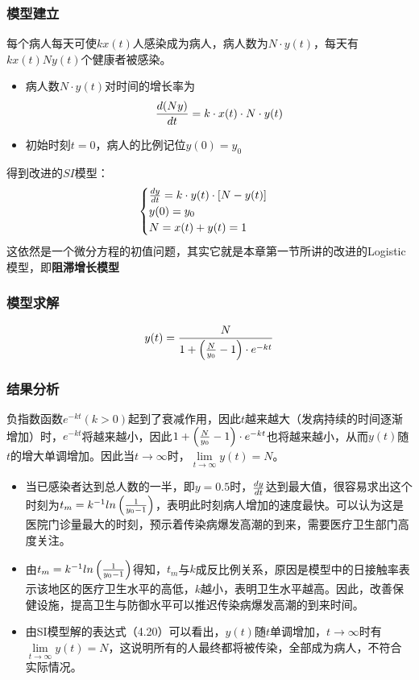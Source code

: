 \documentclass[openany]{progbookcn}
\begin{document}
\subsubsection{模型建立}
\indent 每个病人每天可使$kx(t)$人感染成为病人，病人数为$N\cdot y(t)$，每天有$kx(t)Ny(t)$个健康者被感染。
\begin{itemize}
\item 病人数$N\cdot y(t)$对时间的增长率为
\begin{equation}
{{d(Ny)}\over{dt}}=k\cdot x(t)\cdot N\cdot y(t)
\end{equation}
\item 初始时刻$t=0$，病人的比例记位$y(0)=y_0$
\end{itemize}
\indent 得到改进的$SI$模型：
\begin{equation}
\begin{cases}
{{dy}\over{dt}}=k\cdot y(t)\cdot{[N-y(t)]}\\
y(0)=y_0\\
N=x(t)+y(t)=1
\end{cases}
\end{equation}
\indent 这依然是一个微分方程的初值问题，其实它就是本章第一节所讲的改进的Logistic模型，即{\bf 阻滞增长模型}
\subsubsection{模型求解}
\begin{equation}
y(t)={{N}\over{1+{\left({N\over y_0}-1\right)\cdot e^{-kt}}}}
\end{equation}
\subsubsection{结果分析}
\indent 负指数函数$e^{-kt}(k>0)$起到了衰减作用，因此$t$越来越大（发病持续的时间逐渐增加）时，$e^{-kt}$将越来越小，因此$1+{\left({N\over y_0}-1\right)}\cdot e^{-kt}$也将越来越小，从而$y(t)$随$t$的增大单调增加。因此当$t\to\infty$时，$\mathop{\lim}\limits_{t\to\infty}{y(t)}=N$。
\begin{itemize}[itemindent=2em]
\item 当已感染者达到总人数的一半，即$y=0.5$时，${dy}\over{dt}$达到最大值，很容易求出这个时刻为$t_m=k^{-1}ln\left( {1\over{y_0}-1}\right)$，表明此时刻病人增加的速度最快。可以认为这是医院门诊量最大的时刻，预示着传染病爆发高潮的到来，需要医疗卫生部门高度关注。
\item 由$t_m=k^{-1}ln\left( {1\over{y_0}-1}\right)$得知，$t_m$与$k$成反比例关系，原因是模型中的日接触率表示该地区的医疗卫生水平的高低，$k$越小，表明卫生水平越高。因此，改善保健设施，提高卫生与防御水平可以推迟传染病爆发高潮的到来时间。
\item 由SI模型解的表达式（4.20）可以看出，$y(t)$随$t$单调增加，$t\to\infty$时有$\mathop{\lim}\limits_{t\to\infty}y(t)=N$，这说明所有的人最终都将被传染，全部成为病人，不符合实际情况。
\end{itemize}
\end{document}
